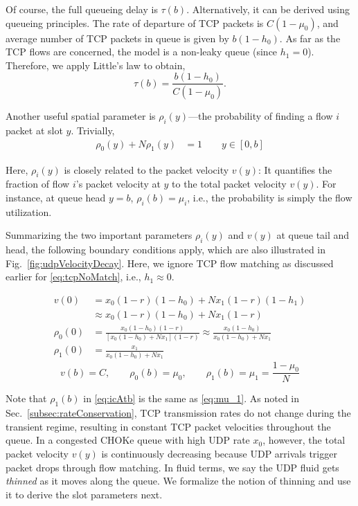 \documentclass{IEEEtran}
\begin{document}
    Of course, the full queueing delay is $\tau(b)$.  Alternatively, it can be derived using queueing principles.  The rate of departure of TCP packets is $C(1-\mu_0)$, and average number of TCP packets in queue is given by $b(1-h_0)$. As far as the TCP flows are concerned, the model is a non-leaky queue (since $h_1=0$). Therefore, we apply Little's law to obtain,
    \begin{equation}\label{eq:fullDelay}
        \tau(b)= \frac{b(1-h_0)}{C(1-\mu_0)}.
    \end{equation}

    Another useful spatial parameter is $\rho_i(y)$---the probability of finding a flow $i$ packet at slot $y$. Trivially,
    \begin{align}
        \rho_0(y)+N\rho_1(y)& =1 \qquad y\in[0,b] \label{eq:initialConditions1}
    \end{align}

    Here, $\rho_i(y)$ is closely related to the packet velocity $v(y)$: It quantifies the fraction of flow $i$'s packet velocity at $y$ to the total packet velocity $v(y)$. For instance, at queue head $y=b$, $\rho_i(b)=\mu_i$, i.e., the probability is simply the flow utilization.

    Summarizing the two important parameters $\rho_i(y)$ and $v(y)$ at queue tail and head, the following boundary conditions apply, which are also illustrated in Fig.~\ref{fig:udpVelocityDecay}. Here, we ignore TCP flow matching as discussed earlier for \eqref{eq:tcpNoMatch}, i.e., $h_1 \approx 0$.

        \begin{align}
        v(0)& = x_0(1-r)(1-h_0)+Nx_1(1-r)(1-h_1) \nonumber \\
            &\approx  x_0(1-r)(1-h_0)+Nx_1(1-r) \label{eq:icv(y)1} \\
        \rho_0(0) &=  \frac{x_0(1-h_0)(1-r)}{[x_0(1-h_0)+Nx_1](1-r)} \approx \frac{x_0(1-h_0)}{x_0(1-h_0)+Nx_1} \label{eq:rho_0(0)} \\
        \rho_1(0) &= \frac{x_1}{x_0(1-h_0)+Nx_1}
    \end{align}
    \begin{equation}\label{eq:icAtb}
        v(b)=C, \qquad \rho_0(b) =\mu_0, \qquad \rho_1(b)= \mu_1=\frac{1-\mu_0}{N}
    \end{equation}

       Note that $\rho_1(b)$ in \eqref{eq:icAtb} is the same as \eqref{eq:mu_1}.  As noted in Sec.~\ref{subsec:rateConservation}, TCP transmission rates do not change during the transient regime, resulting in constant TCP packet velocities throughout the queue. In a congested CHOKe queue with high UDP rate $x_0$, however, the total packet velocity $v(y)$ is continuously decreasing because UDP arrivals trigger packet drops through flow matching. In fluid terms, we say the UDP fluid gets \emph{thinned} as it moves along the queue. We formalize the notion of thinning and use it to derive the slot parameters next.
\end{document}
